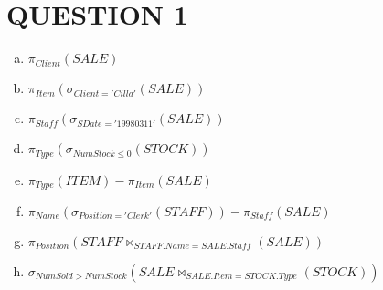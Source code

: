 \documentclass{report}
\begin{document}
\section*{QUESTION 1}
\begin{enumerate}[a)]
	\item $ \pi_{Client}(SALE) $
	\item $ \pi_{Item}(\sigma_{Client = 'Cilla'}(SALE)) $
	\item $ \pi_{Staff}(\sigma_{SDate = '19980311'}(SALE)) $
	\item $ \pi_{Type}(\sigma_{NumStock \leq 0}(STOCK)) $
	\item $ \pi_{Type}(ITEM) - \pi_{Item}(SALE) $
	\item $ \pi_{Name}(\sigma_{Position = 'Clerk'}(STAFF)) - \pi_{Staff}(SALE) $
	\item $ \pi_{Position}(STAFF \bowtie_{STAFF.Name = SALE.Staff}(SALE)) $
	\item $ \sigma_{NumSold > NumStock}(SALE \bowtie_{SALE.Item = STOCK.Type}(STOCK)) $
\end{enumerate}
\end{document}
